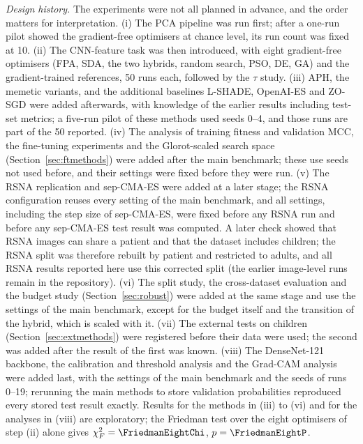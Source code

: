 \documentclass[preprint,12pt]{elsarticle}
\begin{document}
\emph{Design history.} The experiments were not all planned in advance, and the order matters for interpretation. (i) The PCA pipeline was run first; after a one-run pilot showed the gradient-free optimisers at chance level, its run count was fixed at 10. (ii) The CNN-feature task was then introduced, with eight gradient-free optimisers (FPA, SDA, the two hybrids, random search, PSO, DE, GA) and the gradient-trained references, 50 runs each, followed by the $\tau$ study. (iii) APH, the memetic variants, and the additional baselines L-SHADE, OpenAI-ES and ZO-SGD were added afterwards, with knowledge of the earlier results including test-set metrics; a five-run pilot of these methods used seeds 0--4, and those runs are part of the 50 reported. (iv) The analysis of training fitness and validation MCC, the fine-tuning experiments and the Glorot-scaled search space (Section~\ref{sec:ftmethods}) were added after the main benchmark; these use seeds not used before, and their settings were fixed before they were run. (v) The RSNA replication and sep-CMA-ES were added at a later stage; the RSNA configuration reuses every setting of the main benchmark, and all settings, including the step size of sep-CMA-ES, were fixed before any RSNA run and before any sep-CMA-ES test result was computed. A later check showed that RSNA images can share a patient and that the dataset includes children; the RSNA split was therefore rebuilt by patient and restricted to adults, and all RSNA results reported here use this corrected split (the earlier image-level runs remain in the repository). (vi) The split study, the cross-dataset evaluation and the budget study (Section~\ref{sec:robust}) were added at the same stage and use the settings of the main benchmark, except for the budget itself and the transition of the hybrid, which is scaled with it. (vii) The external tests on children (Section~\ref{sec:extmethods}) were registered before their data were used; the second was added after the result of the first was known. (viii) The DenseNet-121 backbone, the calibration and threshold analysis and the Grad-CAM analysis were added last, with the settings of the main benchmark and the seeds of runs 0--19; rerunning the main methods to store validation probabilities reproduced every stored test result exactly. Results for the methods in (iii) to (vi) and for the analyses in (viii) are exploratory; the Friedman test over the eight optimisers of step (ii) alone gives $\chi^2_F=\FriedmanEightChi$, $p=\FriedmanEightP$.
\end{document}
